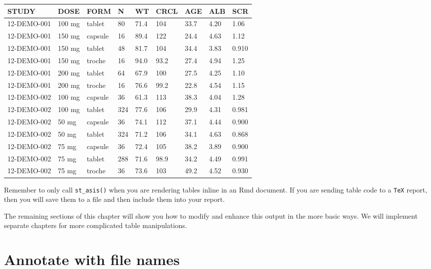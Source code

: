 \documentclass[
]{book}
\begin{document}
\begin{table}[H]
\centering
\setlength{\tabcolsep}{5pt} 
\begin{threeparttable}
\renewcommand{\arraystretch}{1.3}
\begin{tabular}[h]{lllllllll}
\hline
STUDY & DOSE & FORM & N & WT & CRCL & AGE & ALB & SCR \\
\hline
12-DEMO-001 & 100 mg & tablet & 80 & 71.4 & 104 & 33.7 & 4.20 & 1.06 \\
12-DEMO-001 & 150 mg & capsule & 16 & 89.4 & 122 & 24.4 & 4.63 & 1.12 \\
12-DEMO-001 & 150 mg & tablet & 48 & 81.7 & 104 & 34.4 & 3.83 & 0.910 \\
12-DEMO-001 & 150 mg & troche & 16 & 94.0 & 93.2 & 27.4 & 4.94 & 1.25 \\
12-DEMO-001 & 200 mg & tablet & 64 & 67.9 & 100 & 27.5 & 4.25 & 1.10 \\
12-DEMO-001 & 200 mg & troche & 16 & 76.6 & 99.2 & 22.8 & 4.54 & 1.15 \\
12-DEMO-002 & 100 mg & capsule & 36 & 61.3 & 113 & 38.3 & 4.04 & 1.28 \\
12-DEMO-002 & 100 mg & tablet & 324 & 77.6 & 106 & 29.9 & 4.31 & 0.981 \\
12-DEMO-002 & 50 mg & capsule & 36 & 74.1 & 112 & 37.1 & 4.44 & 0.900 \\
12-DEMO-002 & 50 mg & tablet & 324 & 71.2 & 106 & 34.1 & 4.63 & 0.868 \\
12-DEMO-002 & 75 mg & capsule & 36 & 72.4 & 105 & 38.2 & 3.89 & 0.900 \\
12-DEMO-002 & 75 mg & tablet & 288 & 71.6 & 98.9 & 34.2 & 4.49 & 0.991 \\
12-DEMO-002 & 75 mg & troche & 36 & 73.6 & 103 & 49.2 & 4.52 & 0.930 \\
\hline
\end{tabular}
\end{threeparttable}
\end{table}

Remember to only call \texttt{st\_asis()} when you are rendering tables inline in an
Rmd document. If you are sending table code to a \texttt{TeX} report, then
you will save them to a file and then include them into your report.

The remaining sections of this chapter will show you how to modify and
enhance this output in the more basic ways. We will implement separate
chapters for more complicated table manipulations.

\hypertarget{annotate-with-file-names}{%
\section{Annotate with file names}\label{annotate-with-file-names}}
\end{document}
